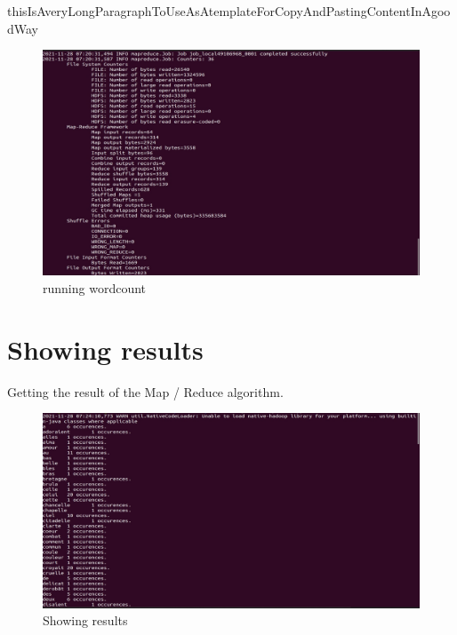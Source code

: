 \begin{spacing}{1.2}
\par thisIsAveryLongParagraphToUseAsAtemplateForCopyAndPastingContentInAgoodWay
\\
\begin{figure}[!htb] 
\begin{center} 
\includegraphics[width=1\linewidth]{Big_Data/Hadoop/Multi-Nodes Map_Reduce/running wordcount} 
\end{center} 
\caption{running wordcount} 
\end{figure} 
\FloatBarrier


\section{Showing results}

\par Getting the result of the Map / Reduce algorithm.
\\
\begin{figure}[!htb] 
\begin{center} 
\includegraphics[width=1\linewidth]{Big_Data/Hadoop/Multi-Nodes Map_Reduce/Showing results} 
\end{center} 
\caption{Showing results} 
\end{figure} 
\FloatBarrier


\end{spacing}